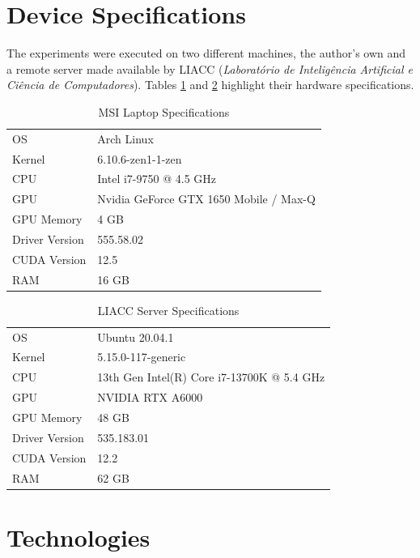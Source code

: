 \section{Device Specifications} \label{sec:method-specs}

The experiments were executed on two different machines, the author's own and a remote server made available by LIACC (\textit{Laboratório de Inteligência Artificial e Ciência de Computadores}). Tables \ref{tab:specs-msi} and \ref{tab:specs-liacc} highlight their hardware specifications.

\begin{table} 
	\begin{tabular}{|l|l|}
		\hline
		OS & Arch Linux \\
		Kernel & 6.10.6-zen1-1-zen \\
		CPU & Intel i7-9750 @ 4.5 GHz \\
		GPU & Nvidia GeForce GTX 1650 Mobile / Max-Q \\
		GPU Memory & 4 GB  \\
		Driver Version & 555.58.02 \\
		CUDA Version & 12.5 \\
		RAM & 16 GB \\
		\hline
	\end{tabular}
\caption{MSI Laptop Specifications}
\label{tab:specs-msi}
\end{table}

\begin{table} 
	\begin{tabular}{|l|l|}
		\hline
		OS & Ubuntu 20.04.1 \\
		Kernel & 5.15.0-117-generic \\
		CPU & 13th Gen Intel(R) Core i7-13700K @ 5.4 GHz \\
		GPU & NVIDIA RTX A6000 \\
		GPU Memory & 48 GB \\
		Driver Version & 535.183.01 \\
		CUDA Version & 12.2 \\
		RAM & 62 GB \\
		\hline
\end{tabular}
\caption{LIACC Server Specifications}
\label{tab:specs-liacc}
\end{table}

\section{Technologies} \label{sec:method-technologies}

